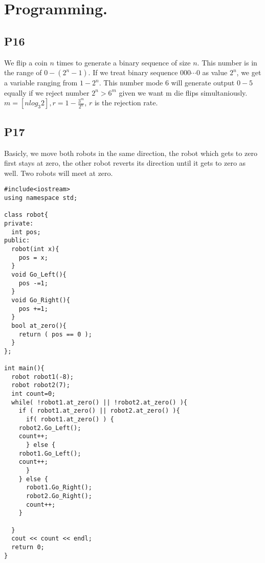 \documentclass[10pt]{article}
\begin{document}
\section{Programming.}

\subsection*{P16 }
We flip a coin $n$ times to generate a binary sequence of size $n$. This number is in the range of $0-(2^{n}-1)$. If we treat binary sequence  $000\cdots 0$ as value $2^n$, we get a variable ranging from $1-2^n$. This number mode 6 will generate output $0-5$ equally if we reject number $2^n > 6^m$ given we want m die flips simultaniously.
$m = [nlog_3 2], r=1-\frac{3^m}{2^n}$, $r$ is the rejection rate.
\subsection*{P17 }
Basicly, we move both robots in the same direction, the robot which gets to zero first stays at zero, the other robot reverts its direction until it gets to zero as well. Two robots will meet at zero.
\begin{lstlisting}
#include<iostream>
using namespace std;

class robot{ 
private:
  int pos;
public:
  robot(int x){
    pos = x;
  }
  void Go_Left(){
    pos -=1;
  }
  void Go_Right(){
    pos +=1;
  }
  bool at_zero(){
    return ( pos == 0 );
  }
};

int main(){
  robot robot1(-8);
  robot robot2(7);
  int count=0;
  while( !robot1.at_zero() || !robot2.at_zero() ){
    if ( robot1.at_zero() || robot2.at_zero() ){
      if( robot1.at_zero() ) {
	robot2.Go_Left();
	count++;
      } else {
	robot1.Go_Left();
	count++;
      }
    } else {
      robot1.Go_Right();
      robot2.Go_Right();
      count++;
    }
   
  }
  cout << count << endl;
  return 0;
}   
  
\end{lstlisting}
\end{document}

